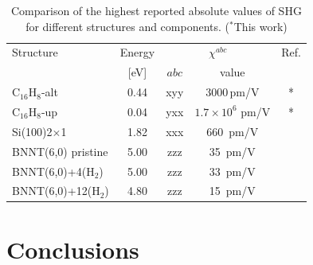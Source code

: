 \documentclass[pss]{wiley2sp} %
\begin{document}
\begin{table}[htb]%
\sidecaption
\begin{tabular}{lcccc}
\hline
\hline
Structure & \hspace{-5mm}Energy & \multicolumn{2}{c}{$\chi^{abc} $} &  Ref.\\
\cline{3-4} & \hspace{-5mm}[eV] & $abc$ & value \\
\hline
C$_{16}$H$_{8}$-alt   &  0.44  & xyy   & 3000\,\scriptsize{pm/V}  & *     \\
C$_{16}$H$_{8}$-up    &  0.04  & yxx   & $1.7\times10^{6}$ \scriptsize{pm/V}  & *     \\
Si(100)2$\times$1     &  1.82  & xxx   & 660\, \scriptsize{pm/V}  & \cite{andersonPRB15}  \\
BNNT(6,0) pristine    &  5.00  & zzz   & 35\,  \scriptsize{pm/V}  & \cite{salazarPRB14} \\
BNNT(6,0)+4(H$_{2}$)  &  5.00  & zzz   & 33\,  \scriptsize{pm/V}  & \cite{salazarPRB14} \\
BNNT(6,0)+12(H$_{2}$) &  4.80  & zzz   & 15\,  \scriptsize{pm/V}  & \cite{salazarPRB14} \\
\hline
\hline
\end{tabular}
\caption[]{%
Comparison of the highest reported absolute values of SHG for 
different structures and components. ($^{*}$This work)}
\label{tab:shgcomp}
\end{table}


\section{Conclusions}\label{sec:conclusions}
\end{document}
